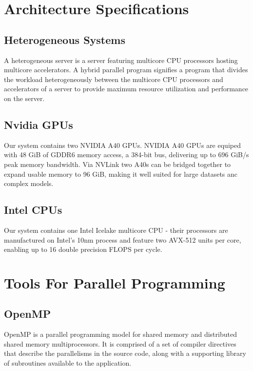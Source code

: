 \documentclass[12pt,a4paper]{article}
\begin{document}
\section{Architecture Specifications}

\subsection{Heterogeneous Systems}

A heterogeneous server is a server featuring multicore CPU processors hosting multicore accelerators. A hybrid parallel program signifies a program that divides the workload heterogeneously between the multicore CPU processors and accelerators of a server to provide maximum resource utilization and performance on the server.

\subsection{Nvidia GPUs}

Our system contains two NVIDIA A40 GPUs. NVIDIA A40 GPUs are equiped with 48 GiB of GDDR6 memory access, a 384-bit bus, delivering up to 696 GiB/s peak memory bandwidth. Via NVLink two A40s can be bridged together to expand usable memory to 96 GiB, making it well suited for large datasets anc complex models.\cite{nvidia_a40}

\subsection{Intel CPUs}

Our system contains one Intel Icelake multicore CPU - their processors are manufactured on Intel's 10nm process and feature two AVX-512 units per core, enabling up to 16 double precision FLOPS per cycle. 

\section{Tools For Parallel Programming}

\subsection{OpenMP}

OpenMP is a parallel programming model for shared memory and distributed shared memory
multiprocessors. It is comprised of a set of compiler directives that describe the parallelisms in the
source code, along with a supporting library of subroutines available to the application.
\end{document}
